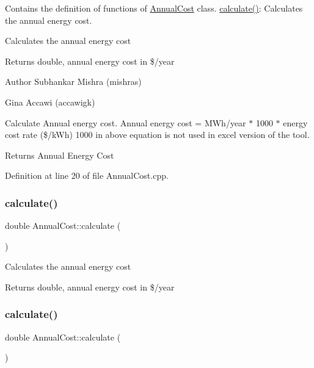Contains the definition of functions of \hyperlink{class_annual_cost}{Annual\+Cost} class. \hyperlink{class_annual_cost_adb12b66af50d01746c3f6f0d430b1fdd}{calculate()}\+: Calculates the annual energy cost. 

Calculates the annual energy cost \begin{DoxyReturn}{Returns}
double, annual energy cost in \$/year
\end{DoxyReturn}
\begin{DoxyAuthor}{Author}
Subhankar Mishra (mishras) 

Gina Accawi (accawigk) 
\end{DoxyAuthor}
Calculate Annual energy cost. Annual energy cost = M\+Wh/year $\ast$ 1000 $\ast$ energy cost rate (\$/k\+Wh) 1000 in above equation is not used in excel version of the tool.

\begin{DoxyReturn}{Returns}
Annual Energy Cost 
\end{DoxyReturn}


Definition at line 20 of file Annual\+Cost.\+cpp.

\mbox{\label{class_annual_cost_adb12b66af50d01746c3f6f0d430b1fdd}} 
\subsubsection{\texorpdfstring{calculate()}{calculate()}\hspace{0.1cm}{\footnotesize\ttfamily [2/3]}}
{\footnotesize\ttfamily double Annual\+Cost\+::calculate (\begin{DoxyParamCaption}{ }\end{DoxyParamCaption})}

Calculates the annual energy cost \begin{DoxyReturn}{Returns}
double, annual energy cost in \$/year 
\end{DoxyReturn}
\mbox{\label{class_annual_cost_adb12b66af50d01746c3f6f0d430b1fdd}} 
\subsubsection{\texorpdfstring{calculate()}{calculate()}\hspace{0.1cm}{\footnotesize\ttfamily [3/3]}}
{\footnotesize\ttfamily double Annual\+Cost\+::calculate (\begin{DoxyParamCaption}{ }\end{DoxyParamCaption})}

